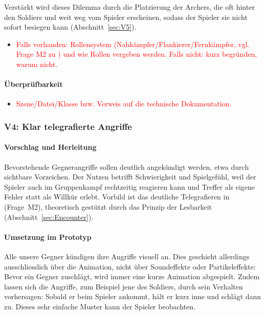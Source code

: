 \documentclass[../Main.tex]{subfiles}
\begin{document}
Verstärkt wird dieses Dilemma durch die Platzierung der Archers, die oft hinter den Soldiers und weit weg vom Spieler erscheinen, sodass der Spieler sie nicht sofort besiegen kann (Abschnitt~\ref{sec:V5}).

\begin{itemize}[leftmargin=1.5cm]
    \item \textcolor{red}{Falls vorhanden: Rollensystem (Nahkämpfer/Flankierer/Fernkämpfer, vgl. Frage M2 zu ) und wie Rollen vergeben werden. Falls nicht: kurz begründen, warum nicht.}
\end{itemize}

\paragraph{Überprüfbarkeit}
\begin{itemize}[leftmargin=1.5cm]
    \item \textcolor{red}{Szene/Datei/Klasse bzw. Verweis auf die technische Dokumentation.}
\end{itemize}

\subsubsection{V4: Klar telegrafierte Angriffe} \label{sec:V4}

\paragraph{Vorschlag und Herleitung}
Bevorstehende Gegnerangriffe sollen deutlich angekündigt werden, etwa durch sichtbare Vorzeichen. Der Nutzen betrifft Schwierigkeit und Spielgefühl, weil der Spieler auch im Gruppenkampf rechtzeitig reagieren kann und Treffer als eigene Fehler statt als Willkür erlebt. Vorbild ist das deutliche Telegrafieren in  (Frage~M2), theoretisch gestützt durch das Prinzip der Lesbarkeit (Abschnitt~\ref{sec:Encounter}).

\paragraph{Umsetzung im Prototyp}
Alle unsere Gegner kündigen ihre Angriffe visuell an. Dies geschieht allerdings ausschliesslich über die Animation, nicht über Soundeffekte oder Partikeleffekte: Bevor ein Gegner zuschlägt, wird immer eine kurze Animation abgespielt. Zudem lassen sich die Angriffe, zum Beispiel jene des Soldiers, durch sein Verhalten vorhersagen: Sobald er beim Spieler ankommt, hält er kurz inne und schlägt dann zu. Dieses sehr einfache Muster kann der Spieler beobachten.
\end{document}
